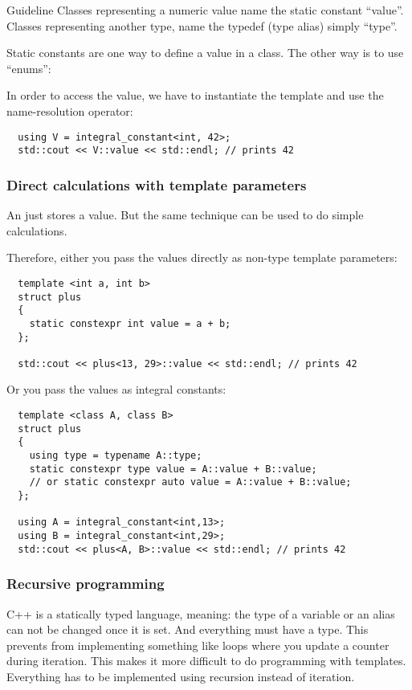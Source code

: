 \begin{guideline}{Guideline}
  Classes representing a numeric value name the static constant ``value''. Classes representing another type, name the typedef (type alias) simply ``type''.
\end{guideline}

\begin{rem}
Static  constants are one way to define a value in a class. The other way is to use ``enums'':
\end{rem}

In order to access the value, we have to instantiate the template and use the name-resolution operator:
\begin{verbatim}
  using V = integral_constant<int, 42>;
  std::cout << V::value << std::endl; // prints 42
\end{verbatim}

\subsubsection{Direct calculations with template parameters}
An  just stores a value. But the same technique can be used to do simple calculations.

Therefore, either you pass the values directly as non-type template parameters:
\begin{verbatim}
  template <int a, int b>
  struct plus
  {
    static constexpr int value = a + b;
  };

  std::cout << plus<13, 29>::value << std::endl; // prints 42
\end{verbatim}

Or you pass the values as integral constants:
\begin{verbatim}
  template <class A, class B>
  struct plus
  {
    using type = typename A::type;
    static constexpr type value = A::value + B::value;
    // or static constexpr auto value = A::value + B::value;
  };

  using A = integral_constant<int,13>;
  using B = integral_constant<int,29>;
  std::cout << plus<A, B>::value << std::endl; // prints 42
\end{verbatim}

\subsubsection{Recursive programming}
C++ is a statically typed language, meaning: the type of a variable or an alias can not be changed once it is set. And everything must
have a type. This prevents from implementing something like loops where you update a counter during iteration. This makes it more
difficult to do programming with templates. Everything has to be implemented using recursion instead of iteration.

